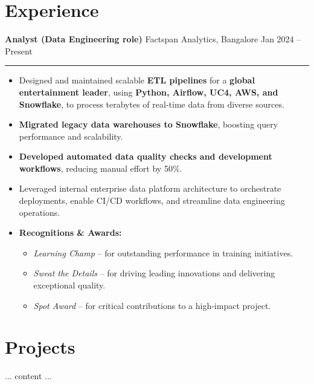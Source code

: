 \section*{Experience}
\textbf{Analyst (Data Engineering role)} \hfill Factspan Analytics, Bangalore \hfill Jan 2024 – Present\vspace{0.2cm}
\hrule
\vspace{0.2cm}
\begin{itemize}
    \item Designed and maintained scalable \textbf{ETL pipelines} for a \textbf{global entertainment leader}, using \textbf{Python, Airflow, UC4, AWS, and Snowflake}, to process terabytes of real-time data from diverse sources.
    \item \textbf{Migrated legacy data warehouses to Snowflake}, boosting query performance and scalability.
    \item \textbf{Developed automated data quality checks and development workflows}, reducing manual effort by 50\%.
    \item Leveraged internal enterprise data platform architecture to orchestrate deployments, enable CI/CD workflows, and streamline data engineering operations.
    \item \textbf{Recognitions \& Awards:}
    \begin{itemize}
        \item \textit{Learning Champ} – for outstanding performance in training initiatives.
        \item \textit{Sweat the Details} – for driving leading innovations and delivering exceptional quality.
        \item \textit{Spot Award} – for critical contributions to a high-impact project.
    \end{itemize}
\end{itemize}

\section*{Projects}
... content ...



